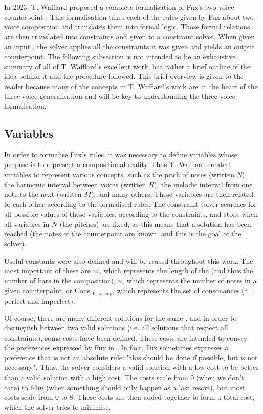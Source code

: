 In 2023, T. Wafflard proposed a complete formalisation of Fux's two-voice counterpoint \cite{wafflard2023}. This formalisation takes each of the rules given by Fux about two-voice composition and translates them into formal logic. Those formal relations are then translated into constraints and given to a constraint solver. When given an input \cf, the solver applies all the constraints it was given and yields an output counterpoint. The following subsection is not intended to be an exhaustive summary of all of T. Wafflard's excellent work, but rather a brief outline of the idea behind it and the procedure followed. This brief overview is given to the reader because many of the concepts in T. Wafflard's work are at the heart of the three-voice generalisation and will be key to understanding the three-voice formalisation.

\subsection{Variables} \label{Wafflard-variables}
In order to formalise Fux's rules, it was necessary to define variables whose purpose is to represent a compositional reality. Thus T. Wafflard created variables to represent various concepts, such as the pitch of notes (written $N$), the harmonic interval between voices (written $H$), the melodic interval from one note to the next (written $M$), and many others. These variables are then related to each other according to the formalised rules. The constraint solver searches for all possible values of these variables, according to the constraints, and stops when all variables in $N$ (the pitches) are fixed, as this means that a solution has been reached (the notes of the counterpoint are known, and this is the goal of the solver).

Useful constants were also defined and will be reused throughout this work. The most important of these are $m$, which represents the length of the \cfs (and thus the number of bars in the composition), $n$, which represents the number of notes in a given counterpoint, or Cons$_{\text{all, p, imp}}$, which represents the set of consonances (all, perfect and imperfect).

Of course, there are many different solutions for the same \cf, and in order to distinguish between two valid solutions (i.e. all solutions that respect all constraints), some costs have been defined. These costs are intended to convey the preferences expressed by Fux in \gap. In fact, Fux sometimes expresses a preference that is not an absolute rule: "this should be done if possible, but is not necessary". Thus, the solver considers a valid solution with a low cost to be better than a valid solution with a high cost. The costs scale from 0 (when we don't care) to 64$m$ (when something should only happen as a last resort), but most costs scale from 0 to 8. These costs are then added together to form a total cost, which the solver tries to minimise.

